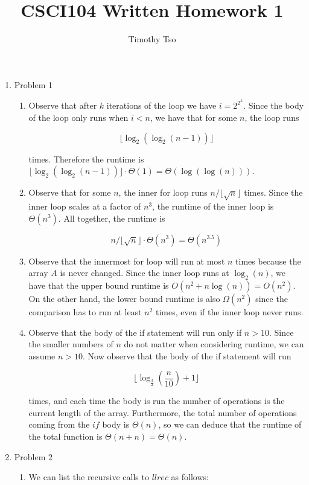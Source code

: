 \documentclass{article}
\begin{document}
\pagecolor{white}

\begin{sloppypar}

\title{CSCI104 Written Homework 1}

\author{Timothy Tso}

\maketitle

\begin{enumerate}
    \item Problem 1
    \begin{enumerate}[label=(\alph*)]
        \item Observe that after $k$ iterations of the loop we have $i=2^{2^k}$. Since the body of the loop only runs when $i<n$, we have that for some $n$, the loop runs

        \[ \lfloor \log_{2} (\log_{2} (n-1)) \rfloor \]

        times. Therefore the runtime is $\lfloor \log_{2} (\log_{2} (n-1)) \rfloor \cdot \Theta(1) = \Theta(\log (\log (n)))$.
        \item Observe that for some $n$, the inner for loop runs $n/\lfloor \sqrt{n} \rfloor$ times. Since the inner loop scales at a factor of $n^3$, the runtime of the inner loop is $\Theta(n^3)$. All together, the runtime is

        \[ n/\lfloor \sqrt{n} \rfloor \cdot \Theta(n^3) = \Theta(n^{3.5}) \]
        \item Observe that the innermost for loop will run at most $n$ times because the array $A$ is never changed. Since the inner loop runs at $\log_{2}(n)$, we have that the upper bound runtime is $O(n^2 + n\log(n)) = O(n^2)$. On the other hand, the lower bound runtime is also $\Omega(n^2)$ since the comparison has to run at least $n^2$ times, even if the inner loop never runs.
        \item Observe that the body of the if statement will run only if $n>10$. Since the smaller numbers of $n$ do not matter when considering runtime, we can assume $n>10$. Now observe that the body of the if statement will run

        \[ \lfloor \log_{\frac 3 2}(\frac n {10}) + 1 \rfloor \]

        times, and each time the body is run the number of operations is the current length of the array. Furthermore, the total number of operations coming from the $if$ body is $\Theta(n)$, so we can deduce that the runtime of the total function is $\Theta(n+n)=\Theta(n)$.
    \end{enumerate}
    \item Problem 2
    \begin{enumerate}[label=(\alph*)]
    \item We can list the recursive calls to $llrec$ as follows:
        

\end{enumerate}
\end{enumerate}
\end{sloppypar}
\end{document}
